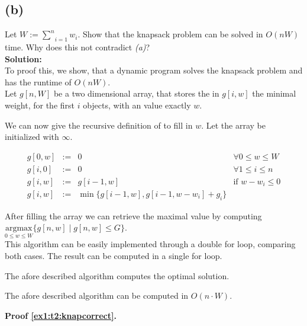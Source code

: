 \subsection*{(b)}

Let $W := \underset{i=1}{\overset{n}{\sum}} w_i$. Show that the knapsack problem can be solved in $O(nW)$ time. Why does this not
contradict \emph{(a)}?\\

\textbf{Solution:}\\

To proof this, we show, that a dynamic program solves the knapsack problem and has the runtime of $O(nW)$.\\
Let $g[n,W]$ be a two dimensional array, that stores the in $g[i,w]$ the minimal weight, for the first $i$ objects,
with an value exactly $w$.

We can now give the recursive definition of to fill in $w$. Let the array be initialized with $\infty$.

$$\begin{array}{lclr}
    g[0,w]  &:=& 0          & \forall 0 \leq w \leq W\\
    g[i,0]  &:=& 0          & \forall 1 \leq i \leq n\\
    g[i,w]  &:=& g[i-1,w]   & \text{if } w - w_i \leq 0\\
    g[i,w]  &:=& \min \{ g[i-1,w] , g[i-1 , w - w_i] + g_i\}
\end{array}$$

After filling the array we can retrieve the maximal value by computing\\
$\underset{0 \leq w \leq W}{\text{argmax}} \{ g[n,w] \; | \; g[n,w] \leq G \}$.\\

This algorithm can be easily implemented through a double for loop, comparing
both cases. The result can be computed in a single for loop.

\begin{lemma}\label{ex1:t2:knapcorrect}
    The afore described algorithm computes the optimal solution.
\end{lemma}

\begin{lemma}\label{ex1:t2:knapruntime}
    The afore described algorithm can be computed in $O(n \cdot W)$.
\end{lemma}

\textbf{Proof \ref{ex1:t2:knapcorrect}.}\\

